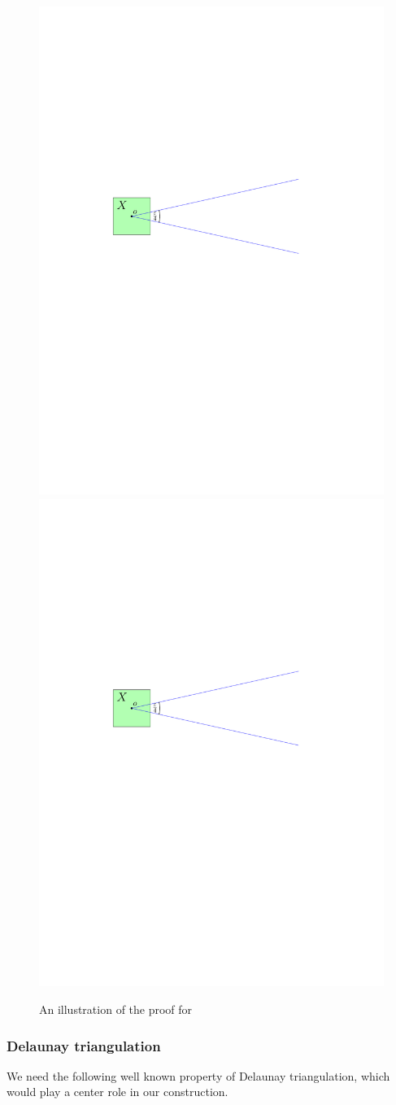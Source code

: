 \documentclass[12pt]{article}%
\begin{document}
\begin{figure}[h]
    \phantom{}\hfill%
    \includegraphics[page=2, width=0.48\linewidth]{figs/double_wedge}%
    \hfill%
    \includegraphics[page=3, width=0.48\linewidth]{figs/double_wedge}%
    \hfill%
    \phantom{}%
    \caption{An illustration of the proof for }
\end{figure}


\subsubsection{Delaunay triangulation}

We need the following well known property of Delaunay triangulation,
which would play a center role in our construction.
\end{document}
